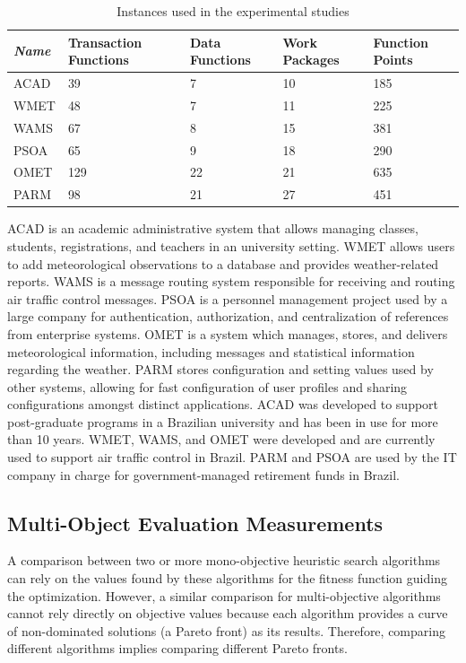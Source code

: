 \documentclass[conference]{IEEEtran}
\begin{document}
\begin{table}[htbp]
  \centering
  \caption{Instances used in the experimental studies}
    \begin{tabular}{p{0.7cm} p{1.5cm}p{1.3cm}p{1.3cm}p{1.3cm}}
    \toprule
    \textit{\textbf{Name}} & \textbf{Transaction Functions} & \textbf{Data Functions} & \textbf{Work Packages} & \textbf{Function Points} \\
    \midrule
    ACAD  & 39    & 7     & 10    & 185 \\
    WMET  & 48    & 7     & 11    & 225 \\
    WAMS  & 67    & 8     & 15    & 381 \\
    PSOA  & 65    & 9     & 18    & 290 \\
    OMET  & 129   & 22    & 21    & 635 \\
    PARM  & 98    & 21    & 27    & 451 \\
    \bottomrule
    \end{tabular}%
\end{table}%

ACAD is an academic administrative system that allows managing classes, students, registrations, and teachers in an university setting. WMET allows users to add meteorological observations to a database and provides weather-related reports. WAMS is a message routing system responsible for receiving and routing air traffic control messages. PSOA is a personnel management project used by a large company for authentication, authorization, and centralization of references from enterprise systems. OMET is a system which manages, stores, and delivers meteorological information, including messages and statistical information regarding the weather. PARM stores configuration and setting values used by other systems, allowing for fast configuration of user profiles and sharing configurations amongst distinct applications. 
ACAD was developed to support post-graduate programs in a Brazilian university and has been in use for more than 10 years. WMET, WAMS, and OMET were developed and are currently used to support air traffic control in Brazil. PARM and PSOA are used by the IT company in charge for government-managed retirement funds in Brazil.
	

\subsection{Multi-Object Evaluation Measurements}
A comparison between two or more mono-objective heuristic search algorithms can rely on the values found by these algorithms for the fitness function guiding the optimization. However, a similar comparison for multi-objective algorithms cannot rely directly on objective values because each algorithm provides a curve of non-dominated solutions (a Pareto front) as its results. Therefore, comparing different algorithms implies comparing different Pareto fronts. 
\end{document}
